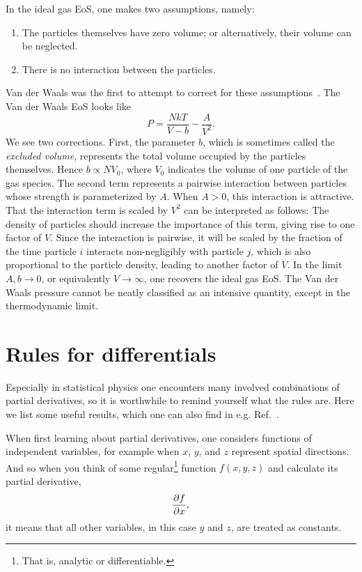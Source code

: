 In the ideal gas EoS, one makes two assumptions, namely:
\begin{enumerate}
\item The particles themselves have zero volume; or alternatively,
their volume can be neglected. 
\item There is no interaction between the particles.
\end{enumerate}
Van der Waals was the first to attempt to correct for these 
assumptions~\cite{van_der_waals_over_1873}. The Van der Waals EoS looks like
\begin{equation}\label{eq:vanderwaals}
P=\frac{NkT}{V-b}-\frac{A}{V^2}.
\end{equation}
We see two corrections. First, the parameter $b$, which is sometimes
called the {\it excluded volume}, represents the total
volume occupied by the particles themselves. Hence $b\propto NV_0$, where $V_0$
indicates the volume of one particle of the gas species. The second term
represents a pairwise interaction between particles whose strength
is parameterized by $A$. When $A>0$, this interaction is attractive.
That the interaction term is scaled by $V^2$ can be interpreted as follows:
The density of particles should increase the importance of this term, giving
rise to one factor of $V$. Since the interaction is pairwise, it will be scaled
by the fraction of the time particle $i$ interacts non-negligibly with particle
$j$, which is also proportional to the particle density, leading to another
factor of $V$. In the limit $A,b\to0$, or equivalently $V\to\infty$,
one recovers the ideal gas EoS.
The Van der Waals pressure cannot be neatly classified as an intensive quantity,
except in the thermodynamic limit. 


\section{Rules for differentials}\label{sec:thermdiff}

Especially in statistical physics one encounters many involved combinations
of partial derivatives, so it is worthwhile to remind yourself what the
rules are. Here we list some useful results, which one can also
find in e.g. Ref.~\cite{huang_introduction_2001}.

When first learning about partial derivatives, one considers functions
of independent variables, for example when $x$, $y$, and $z$ represent
spatial directions. And so when you think of some
regular\footnote{That is, analytic or differentiable.} 
function $f(x,y,z)$
and calculate its partial derivative,
\begin{equation}
\pdv{f}{x},
\end{equation}
it means that all other variables, in this case $y$ and $z$, are treated as
constants.



